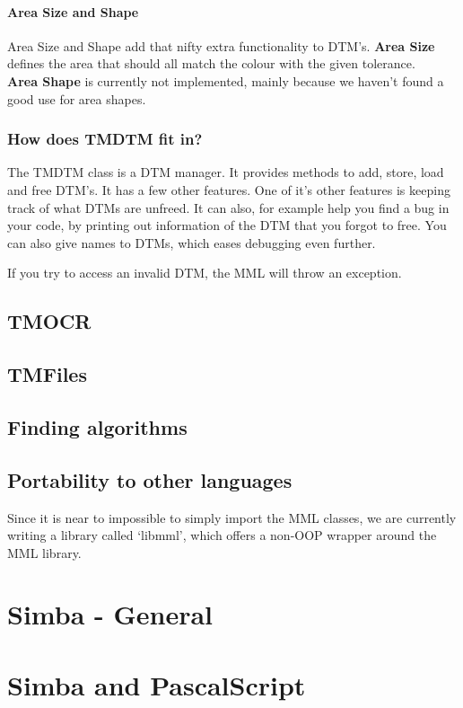 \documentclass[a4paper, 10pt]{report} %
\begin{document}
\subsubsection{Area Size and Shape}

Area Size and Shape add that nifty extra functionality to DTM's.
\textbf{Area Size} defines the area that should all match the colour
with the given tolerance. \\
\textbf{Area Shape} is currently not implemented, mainly because
we haven't found a good use for area shapes.

\subsection{How does TMDTM fit in?}

The TMDTM class is a DTM manager. It provides methods to add, store, load
and free DTM's. It has a few other features. One of it's other features
is keeping track of what DTMs are unfreed. It can also, for example help you
find a bug in your code, by printing out information of the DTM that you forgot to free.
You can also give names to DTMs, which eases debugging even further.

If you try to access an invalid DTM, the MML will throw an exception.

\section{TMOCR}

\section{TMFiles}

\section{Finding algorithms}

\section{Portability to other languages}

Since it is near to impossible to simply import the MML classes, we are
currently writing a library called `libmml', which offers a non-OOP wrapper
around the MML library.


\chapter{Simba - General}

\chapter{Simba and PascalScript}
\end{document}
